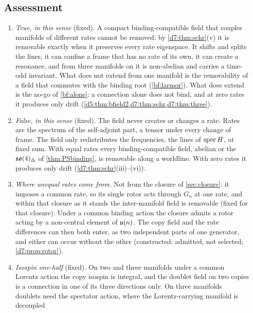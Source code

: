 \subsection{Assessment}
\label{d7:sec:assess}

\begin{remark}
\label{d7:rem:verdict}
\begin{enumerate}[label=(\alph*),leftmargin=2.2em]
\item \emph{True, in this sense} (fixed). A compact binding-compatible field that couples manifolds of different rates cannot be removed: by \cref{d7:thm:schr}(v) it is removable exactly when it preserves every rate eigenspace. It shifts and
splits the lines, it can confine a frame that has no rate of its own, it can create a resonance, and from three manifolds on it is non-abelian and
carries a time-odd invariant. What does not extend from one manifold is the removability of a field that commutes with the binding root
(\cref{bf:larmor}). What does extend is the no-go of \cref{bf:alone}: a connection alone does not bind, and at zero rates it produces
only drift (\cref{d5:thm:bfield2,d7:thm:schr,d7:thm:three}).
\item \emph{False, in this sense} (fixed). The field never creates or changes a rate. Rates are the spectrum of the self-adjoint part, a tensor under
every change of frame. The field only redistributes the frequencies, the lines of $\operatorname{spec} H$, at fixed sum. With equal rates every binding-compatible field, abelian or the $\mathfrak{so}(4)_\Delta$ of \cref{thm:PSbinding}, is removable along a worldline. With zero rates it produces only drift (\cref{d7:thm:schr}(iii)--(vi)).
\item \emph{Where unequal rates come from.} Not from the closure of \cref{sec:closure}: it imposes a common rate, so its single rotor acts through $G_n$ at one rate, and within that closure as it stands
the inter-manifold field is removable (fixed for that closure). Under a common binding action the closure admits a rotor acting by a non-central element
of $\mathfrak{u}(n)$. The copy field and the rate differences can then both enter, as two independent parts of one generator, and either can occur
without the other (constructed: admitted, not selected; \cref{d7:prop:rotor}).
\item \emph{Isospin one-half} (fixed). On two and three manifolds under a common Lorentz action the copy isospin is integral, and the doublet field on two copies is a connection
in one of its three directions only. On three manifolds doublets need the spectator action, where the Lorentz-carrying manifold is decoupled

\end{enumerate}
\end{remark}
